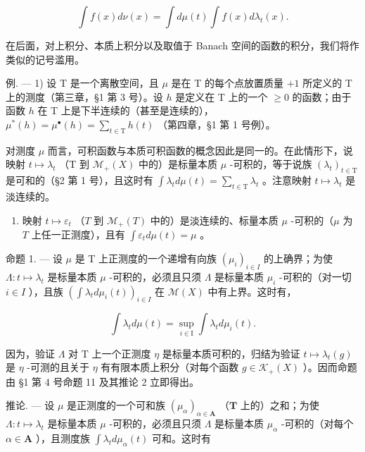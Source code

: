 \[
\int f (x) d \nu (x) = \int d \mu (t) \int f (x) d \lambda_ {t} (x).\tag{1}
\]

在后面，对上积分、本质上积分以及取值于 Banach 空间的函数的积分，我们将作类似的记号滥用。

例. --- 1) 设 T 是一个离散空间，且 \(\mu\) 是在 T 的每个点放置质量 \(+1\) 所定义的 T 上的测度（第三章，§1 第 3 号）。设 \(h\) 是定义在 T 上的一个 \(\geqslant 0\) 的函数；由于函数 \(h\) 在 T 上是下半连续的（甚至是连续的），\(\mu^{*}(h) = \mu^{\bullet}(h) = \sum_{t\in \mathrm{T}}h(t)\) （第四章，§1 第 1 号例）。

对测度 \(\mu\) 而言，可积函数与本质可积函数的概念因此是同一的。在此情形下，说映射 \(t \mapsto \lambda_t\) （T 到 \(\mathcal{M}_+(X)\) 中的）是标量本质 \(\mu\) -可积的，等于说族 \((\lambda_t)_{t \in \mathrm{T}}\) 是可和的（§2 第 1 号），且这时有 \(\int \lambda_t d\mu(t) = \sum_{t \in \mathrm{T}} \lambda_t\) 。注意映射 \(t \mapsto \lambda_t\) 是淡连续的。

\begin{enumerate}
\def\labelenumi{\arabic{enumi})}
\setcounter{enumi}{1}
\tightlist
\item
  映射 \(t \mapsto \varepsilon_t\) （\(T\) 到 \(\mathcal{M}_+(T)\) 中的）是淡连续的、标量本质 \(\mu\) -可积的（\(\mu\) 为 \(T\) 上任一正测度），且有 \(\int \varepsilon_t d\mu(t) = \mu\) 。
\end{enumerate}

命题 1. --- 设 \(\mu\) 是 T 上正测度的一个递增有向族 \((\mu_i)_{i \in I}\) 的上确界；为使 \(\Lambda : t \mapsto \lambda_t\) 是标量本质 \(\mu\) -可积的，必须且只须 \(\Lambda\) 是标量本质 \(\mu_i\) -可积的（对一切 \(i \in I\) ），且族 \(\left( \int \lambda_t d\mu_i(t) \right)_{i \in I}\) 在 \(\mathcal{M}(X)\) 中有上界。这时有，

\[
\int \lambda_ {t} d \mu (t) = \sup _ {i \in \mathrm{I}} \int \lambda_ {t} d \mu_ {i} (t).\tag{2}
\]

因为，验证 \(\Lambda\) 对 T 上一个正测度 \(\eta\) 是标量本质可积的，归结为验证 \(t \mapsto \lambda_{t}(g)\) 是 \(\eta\) -可测的且关于 \(\eta\) 有有限本质上积分（对每个函数 \(g \in \mathcal{K}_{+}(X)\) ）。因而命题由 §1 第 4 号命题 11 及其推论 2 立即得出。

推论. --- 设 \(\mu\) 是正测度的一个可和族 \((\mu_{\alpha})_{\alpha \in \mathbf{A}}\) （\(\mathbf{T}\) 上的）之和；为使 \(\Lambda : t \mapsto \lambda_t\) 是标量本质 \(\mu\) -可积的，必须且只须 \(\Lambda\) 是标量本质 \(\mu_{\alpha}\) -可积的（对每个 \(\alpha \in \mathbf{A}\) ），且测度族 \(\int \lambda_t d\mu_{\alpha}(t)\) 可和。这时有

